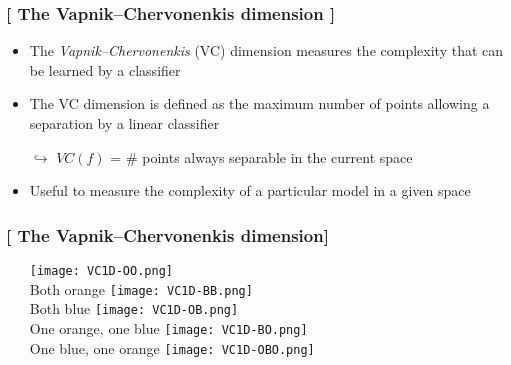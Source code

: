 \documentclass[xcolor=x11names,compress, handhouts]{beamer}
\renewcommand{\(}{\begin{columns}}
\renewcommand{\)}{\end{columns}}
\newcommand{\<}[1]{\begin{column}{#1}}
\renewcommand{\>}{\end{column}}
\begin{document}
\begin{frame} %
\frametitle{\textcolor{brique}{[ The  Vapnik–Chervonenkis dimension ]}}
\pause
\begin{itemize}[<+->]
    \item The \textit{Vapnik–Chervonenkis} (VC) dimension measures the complexity that can be learned by a classifier
    \item The VC dimension is defined as the maximum  number of points allowing a separation by a linear classifier
    \item[$\hookrightarrow$]  $ VC(f)$ = \# points always separable in the current space
    \item Useful to measure the complexity of a particular model in a given space
\end{itemize}
\end{frame}

\begin{frame} %
\frametitle{\textcolor{brique}{[ The  Vapnik–Chervonenkis dimension]}}
\begin{itemize}
   \item[] 
    {\texttt{[image: VC1D-OO.png]} \\ }
    {Both orange }
    {\texttt{[image: VC1D-BB.png]} \\ }
    {Both blue}
    {\texttt{[image: VC1D-OB.png]} \\ }
    {One orange, one blue}
    {\texttt{[image: VC1D-BO.png]} \\ }
    {One blue, one orange}
    {\texttt{[image: VC1D-OBO.png]}  \\ }
\end{itemize}
\end{frame}
\end{document}
